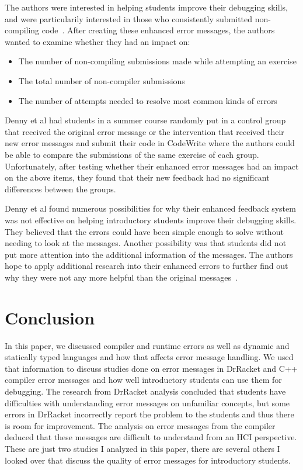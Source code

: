 \documentclass{sig-alternate}
\begin{document}
The authors were interested in helping students improve their debugging skills, and were particularily interested in those who consistently submitted non-compiling code~\cite{Denny:2014:ESE:2591708.2591748}.
After creating these enhanced error messages, the authors wanted to examine whether they had an impact on:
\begin{itemize}
	\item The number of non-compiling submissions made while attempting an exercise
	\item The total number of non-compiler submissions
	\item The number of attempts needed to resolve most common kinds of errors
\end{itemize}

Denny et al had students in a summer course randomly put in a control group that received the original error message or the intervention that received their new error messages and submit their code in CodeWrite where the authors could be able to compare the submissions of the same exercise of each group.
Unfortunately, after testing whether their enhanced error messages had an impact on the above items, they found that their new feedback had no significant differences between the groups.

Denny et al found numerous possibilities for why their enhanced feedback system was not effective on helping introductory students improve their debugging skills.
They believed that the errors could have been simple enough to solve without needing to look at the messages.
Another possibility was that students did not put more attention into the additional information of the messages.
The authors hope to apply additional research into their enhanced errors to further find out why they were not any more helpful than the original messages~\cite{Denny:2014:ESE:2591708.2591748}.


\section{Conclusion}\label{sec:concl}

In this paper, we discussed compiler and runtime errors as well as dynamic and statically typed languages and how that affects error message handling.
We used that information to discuss studies done on error messages in DrRacket and C++ compiler error messages and how well introductory students can use them for debugging.
The research from DrRacket analysis concluded that students have difficulties with understanding error messages on unfamiliar concepts, but some errors in DrRacket incorrectly report the problem to the students and thus there is room for improvement.
The analysis on error messages from the compiler deduced that these messages are difficult to understand from an HCI perspective.
These are just two studies I analyzed in this paper, there are several others I looked over that discuss the quality of error messages for introductory students.
\end{document}
